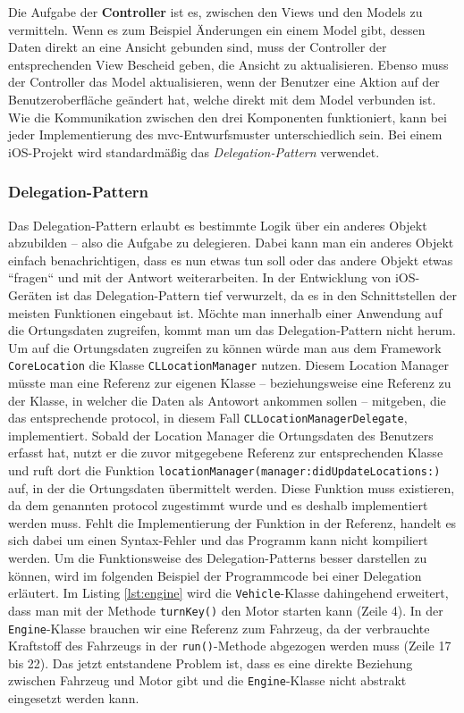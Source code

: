 %
Die Aufgabe der \textbf{Controller} ist es, zwischen den Views und den Models zu vermitteln.
Wenn es zum Beispiel Änderungen ein einem Model gibt, dessen Daten direkt an eine Ansicht gebunden sind, muss der Controller der entsprechenden View Bescheid geben, die Ansicht zu aktualisieren.
Ebenso muss der Controller das Model aktualisieren, wenn der Benutzer eine Aktion auf der Benutzeroberfläche geändert hat, welche direkt mit dem Model verbunden ist.
Wie die Kommunikation zwischen den drei Komponenten funktioniert, kann bei jeder Implementierung des \ac{mvc}-Entwurfsmuster unterschiedlich sein.
Bei einem iOS-Projekt wird standardmäßig das \textit{Delegation-Pattern} verwendet.

\subsubsection{Delegation-Pattern}
Das Delegation-Pattern erlaubt es bestimmte Logik über ein anderes Objekt abzubilden – also die Aufgabe zu delegieren.
Dabei kann man ein anderes Objekt einfach benachrichtigen, dass es nun etwas tun soll oder das andere Objekt etwas ``fragen`` und mit der Antwort weiterarbeiten.
In der Entwicklung von iOS-Geräten ist das Delegation-Pattern tief verwurzelt, da es in den Schnittstellen der meisten Funktionen eingebaut ist.
Möchte man innerhalb einer Anwendung auf die Ortungsdaten zugreifen, kommt man um das Delegation-Pattern nicht herum.\pbreak%
%
Um auf die Ortungsdaten zugreifen zu können würde man aus dem Framework \texttt{CoreLocation} die Klasse \texttt{CLLocationManager} nutzen.
Diesem Location Manager müsste man eine Referenz zur eigenen Klasse – beziehungsweise eine Referenz zu der Klasse, in welcher die Daten als Antowort ankommen sollen – mitgeben, die das entsprechende \Gls{protocol}, in diesem Fall \texttt{CLLocationManagerDelegate}, implementiert.
Sobald der Location Manager die Ortungsdaten des Benutzers erfasst hat, nutzt er die zuvor mitgegebene Referenz zur entsprechenden Klasse und ruft dort die Funktion \texttt{locationManager(manager:didUpdateLocations:)} auf, in der die Ortungsdaten übermittelt werden.
Diese Funktion muss existieren, da dem genannten \Gls{protocol} zugestimmt wurde und es deshalb implementiert werden muss.
Fehlt die Implementierung der Funktion in der Referenz, handelt es sich dabei um einen Syntax-Fehler und das Programm kann nicht kompiliert werden.\pbreak%
%
Um die Funktionsweise des Delegation-Patterns besser darstellen zu können, wird im folgenden Beispiel der Programmcode bei einer Delegation erläutert.
Im Listing \ref{lst:engine} wird die \texttt{Vehicle}-Klasse dahingehend erweitert, dass man mit der Methode \texttt{turnKey()} den Motor starten kann (Zeile 4).
In der \texttt{Engine}-Klasse brauchen wir eine Referenz zum Fahrzeug, da der verbrauchte Kraftstoff des Fahrzeugs in der \texttt{run()}-Methode abgezogen werden muss (Zeile 17 bis 22).
Das jetzt entstandene Problem ist, dass es eine direkte Beziehung zwischen Fahrzeug und Motor gibt und die \texttt{Engine}-Klasse nicht abstrakt eingesetzt werden kann.\\

